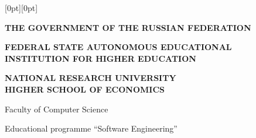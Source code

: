 \thispagestyle{approval}
\enlargethispage{3cm}
\begingroup
\hseApprovalTight

\noindent
\raisebox{-25cm}[0pt][0pt]{%
%
}%

\begin{center}
\textbf{THE GOVERNMENT OF THE RUSSIAN FEDERATION}

\textbf{FEDERAL STATE AUTONOMOUS EDUCATIONAL\\
INSTITUTION FOR HIGHER EDUCATION}

\textbf{NATIONAL RESEARCH UNIVERSITY\\
HIGHER SCHOOL OF ECONOMICS}

\hseFormGap{0.2cm}

\small
Faculty of Computer Science

Educational programme \enquote{Software Engineering}
\end{center}

\hseFormGap{0.3cm}

